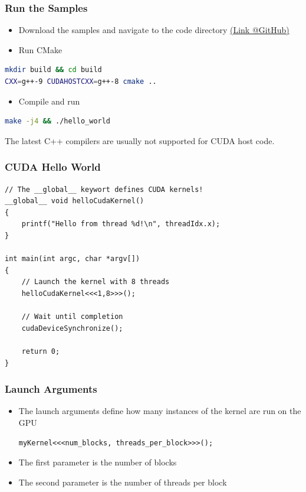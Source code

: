 \documentclass[aspectratio=169]{beamer}
\begin{document}
\begin{frame}[fragile]
\frametitle{Run the Samples}
\begin{itemize}
	\item Download the samples and navigate to the code directory \href{https://github.com/darglein/saiga/tree/master/samples/cuda/helloCuda}{(Link @GitHub)}
	\item Run CMake 
\end{itemize}
\begin{lstlisting}[language=bash]
mkdir build && cd build
CXX=g++-9 CUDAHOSTCXX=g++-8 cmake ..
\end{lstlisting}
\begin{itemize}
	\item Compile and run
\end{itemize}
\begin{lstlisting}[language=bash]
make -j4 && ./hello_world
\end{lstlisting}

\begin{mdframed}[frametitle=Note:]
	The latest C++ compilers are usually not supported for CUDA host code.
\end{mdframed}
	
\end{frame}

\begin{frame}[fragile]
\frametitle{CUDA Hello World}
\begin{lstlisting}
// The __global__ keywort defines CUDA kernels!
__global__ void helloCudaKernel()
{
	printf("Hello from thread %d!\n", threadIdx.x);
}

int main(int argc, char *argv[])
{
	// Launch the kernel with 8 threads
	helloCudaKernel<<<1,8>>>();
	
	// Wait until completion
	cudaDeviceSynchronize();
	
	return 0;
}
\end{lstlisting}
\end{frame}



\begin{frame}[fragile]
	\frametitle{Launch Arguments}
	\begin{itemize}
		\item The launch arguments define how many instances of the kernel are run on the GPU
\begin{lstlisting}
myKernel<<<num_blocks, threads_per_block>>>();
\end{lstlisting}
		\item The first parameter is the number of blocks
		\item The second parameter is the number of threads per block
	\end{itemize}
\end{frame}
\end{document}

